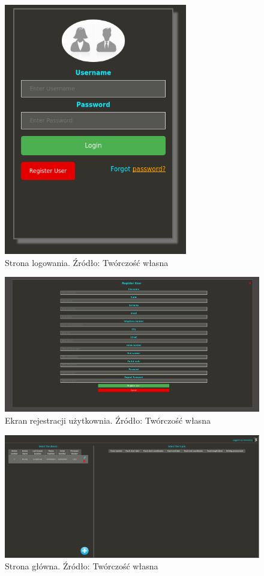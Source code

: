 \begin{figure}[H]
	\centering
	\includegraphics[width=8cm]{img/software/website/login_window.png}
	\caption{Strona logowania. Źródło: Twórczość własna}
	\label{fig:image_soft_website_login}
\end{figure}

\begin{figure}[H]
	\centering
	\includegraphics[width=17cm]{img/software/website/register_user.png}
	\caption{Ekran rejestracji użytkownia. Źródło: Twórczość własna}
	\label{fig:image_soft_website_register_user}
\end{figure}

\begin{figure}[H]
	\centering
	\includegraphics[width=18cm]{img/software/website/main_screen.png}
	\caption{Strona główna. Źródło: Twórczość własna}
	\label{fig:image_soft_website_main_page}
\end{figure}

